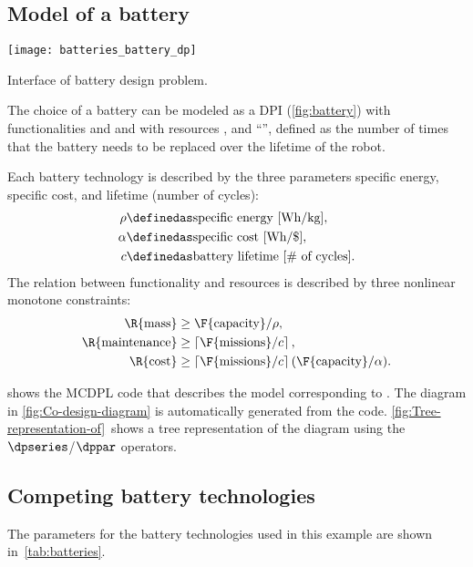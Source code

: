 \subsection{Model of a battery}
\begin{marginfigure}
    \centering
    \texttt{[image: batteries\_battery\_dp]}
    \caption{Interface of battery design problem.}
    \label{fig:battery}
\end{marginfigure}

The choice of a battery can be modeled as a DPI (\cref{fig:battery}) with functionalities  and  and with resources ,  and ``'', defined as the number of times that the battery needs to be repl\-aced over the lifetime of the robot.

Each battery technology is described by the three parameters specific energy, specific cost, and lifetime (number of cycles):
\begin{align}
    \rho   & \definedas\text{specific energy [Wh/kg]}, \\
    \alpha & \definedas\text{specific cost [Wh/\$]}, \\
    c      & \definedas\text{battery lifetime [\# of cycles]}.
\end{align}
The relation between functionality and resources is described by three nonlinear monotone constraints:
\begin{align}
    \R{\text{mass}}        & \geq\F{\text{capacity}}/\rho,\label{eq:mass} \\
    \R{\text{maintenance}} & \geq\left\lceil \F{\text{missions}}/c\right\rceil,\label{eq:maintenance} \\
    \R{\text{cost}}        & \geq\left\lceil \F{\text{missions}}/c\right\rceil (\F{\text{capacity}}/\alpha).
    \label{eq:cost}
\end{align}

 shows the MCDPL code that describes the model corresponding to .
The diagram in \cref{fig:Co-design-diagram} is automatically generated from the code.
\cref{fig:Tree-representation-of}~shows a tree representation of the diagram using the $\dpseries$/$\dppar$ operators.

\subsection{Competing battery technologies}

The parameters for the battery technologies used in this example are shown in~\cref{tab:batteries}.

